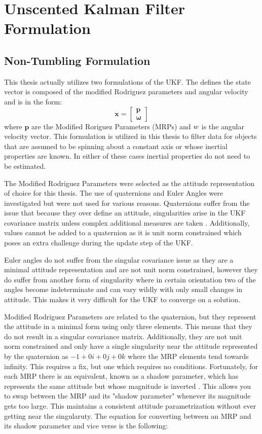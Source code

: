 \chapter{Unscented Kalman Filter Formulation}

\section{Non-Tumbling Formulation}
This thesis actually utilizes two formulations of the UKF. The defines the state vector is composed of the modified Rodriguez parameters and angular velocity and is in the form:
\begin{equation}
\bm{x} = \begin{bmatrix} \bm{p} \\ \bm{\omega} \end{bmatrix}
\end{equation}
where $\bm{p}$ are the Modified Roriguez Parameters (MRPs) and  $\boldmath{w}$ is the angular velocity vector. This formulation is utilized in this thesis to filter data for objects that are assumed to be spinning about a constant axis or whose inertial properties are known. In either of these cases inertial properties do not need to be estimated.

The Modified Rodriguez Parameters were selected as the attitude representation of choice for this thesis. The use of quaternions and Euler Angles were investigated but were not used for various reasons. Quaternions suffer from the issue that because they over define an attitude, singularities arise in the UKF covariance matrix unless complex additional measures are taken \cite{Linares_data_fusion}. Additionally, values cannot be added to a quaternion as it is unit norm constrained which poses an extra challenge during the update step of the UKF.

Euler angles do not suffer from the singular covariance issue as they are a minimal attitude representation and are not unit norm constrained, however they do suffer from another form of singularity where in certain orientation two of the angles become indeterminate and can vary wildly with only small changes in attitude. This makes it very difficult for the UKF to converge on a solution.

Modified Rodriguez Parameters are related to the quaternion, but they represent the attitude in a minimal form using only three elements. This means that they do not result in a singular covariance matrix. Additionally, they are not unit norm constrained and only have a single singularity near the attitude represented by the quaternion as $-1 + 0i + 0j + 0k$ where the MRP elements tend towards infinity. This requires a fix, but one which requires no conditions. Fortunately, for each MRP there is an equivalent, known as a shadow parameter, which has represents the same attitude but whose magnitude is inverted \cite{MRPs}. This allows you to swap between the MRP and its "shadow parameter" whenever its magnitude gets too large. This maintains a consistent attitude parametrization without ever getting near the singularuty. The equation for converting between an MRP and its shadow parameter and vice verse is the following:

